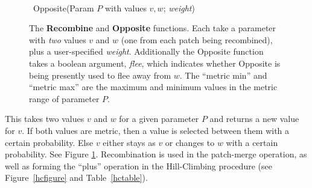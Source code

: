 \documentclass{article}
\begin{document}
{\begin{figure}[t]
\begin{minipage}{\linewidth}
\begin{minipage}[t]{\linewidth}
\begin{algorithm}[H]
\begin{algorithmic}
  \end{algorithmic}
\end{algorithm}
\end{minipage}\\
\begin{minipage}[t]{\linewidth}
\begin{algorithm}[H]
   \caption{~Opposite(Param \(P\) with values \(v, w\); {\it weight})}
   \label{alg:opposite}
\end{algorithm}
\end{minipage}
\end{minipage}
\caption{The {\bf Recombine} and {\bf Opposite} functions.  Each take a parameter with {\it two} values \(v\) and \(w\) (one from each patch being recombined), plus a user-specified {\it weight}.  Additionally the Opposite function takes a boolean argument, {\it flee}, which indicates whether Opposite is being presently used to flee away from \(w\).   The ``metric min'' and ``metric max'' are the maximum and minimum values in the metric range of parameter \(P\).}
\label{recombine}
\end{figure}

\vspace{1em}\quad
This takes two values \(v\) and \(w\) for a given parameter \(P\) and returns a new value for \(v\).  If both values are metric, then a value is selected between them with a certain probability.  Else \(v\) either stays as \(v\) or changes to \(w\) with a certain probability.  See Figure \ref{recombine}.  Recombination is used in the patch-merge operation, as well as forming the ``plus'' operation in the Hill-Climbing procedure (see Figure~\ref{hcfigure} and Table~\ref{hctable}). 

}
\end{document}
